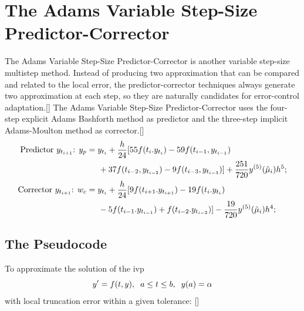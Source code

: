 \documentclass[12pt,oneside]{book}
\begin{document}
\begin{spacing}{1.2}
		\end{spacing}
		
		\clearpage
	\section{The Adams Variable Step-Size Predictor-Corrector} \label{m:abpcvs}
		\begin{spacing}{1.2}
			
			The Adams Variable Step-Size Predictor-Corrector is another variable step-size multistep method. Instead of producing two approximation that can be compared and related to the local error, the predictor-corrector techniques always generate two approximation at each step, so they are naturally candidates for error-control adaptation.[] \newline
			The Adams Variable Step-Size Predictor-Corrector uses the four-step explicit Adams Bashforth method as predictor and the three-step implicit Adams-Moulton method as corrector.[]
			\begin{equation}
				\begin{split}
					\text{Predictor $ y_{t_{i+1}} $: } y_{p} & = y_{t_i} + \frac{h}{24} [ 55f(t_{i}. y_{t_i}) - 59f(t_{i-1}, y_{t_{i-1}}) \\
					& \hspace*{0.5cm} + 37f(t_{i-2}, y_{t_{i-2}}) - 9f(t_{i-3}, y_{t_{i-3}}) ] + \frac{251}{720}y^{(5)}(\hat{\mu}_i)h^5; \\
					\text{Corrector $ y_{t_{i+1}} $: } w_{c} & = y_{t_i} + \frac{h}{24} [ 9f(t_{i+1}. y_{t_{i+1}}) - 19f(t_{i}. y_{t_{i}}) \\
					& \hspace*{0.5cm} - 5f(t_{i-1}. y_{t_{i-1}}) + f(t_{i-2}. y_{t_{i-2}}) ] - \frac{19}{720}y^{(5)}( \tilde{\mu}_i)h^4;
				\end{split}
			\end{equation}
			
			
			\subsection*{The Pseudocode}
				To approximate the solution of the \ac{ivp} 
				\[ y' = f(t,y), \hspace*{0.2cm} a \leq t \leq b, \hspace*{0.2cm} y(a) = \alpha \]
				with local truncation error within a given tolerance: []
				

\end{spacing}
\end{document}
